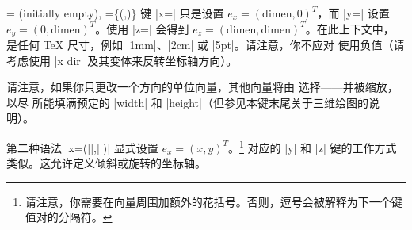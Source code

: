 \begin{pgfplotsxykeylist}{%
    \x= (initially empty),
    \x={\{(,)\}}%
}
    键 |x=| 只是设置 $e_x = (\text{dimen},0)^T$，而 |y=| 设置 $e_y = (0,\text{dimen})^T$。使用 |z=| 会得到 $e_z = (\text{dimen},\text{dimen})^T$。在此上下文中， 是任何 \TeX{} 尺寸，例如 |1mm|、|2cm| 或 |5pt|。请注意，你不应对  使用负值（请考虑使用 |x dir| 及其变体来反转坐标轴方向）。
\begin{codeexample}[]
\end{codeexample}

\begin{codeexample}[]
\end{codeexample}

    请注意，如果你只更改一个方向的单位向量，其他向量将由 \PGFPlots{} 选择——并被缩放，以尽 \PGFPlots{} 所能填满预定的 |width| 和 |height|（但参见本键末尾关于三维绘图的说明）。
\begin{codeexample}[]
\end{codeexample}

    第二种语法 |x={(||,||)}| 显式设置 $e_x = (\mathit{x},\mathit{y})^T$。\footnote{请注意，你需要在向量周围加额外的花括号。否则，逗号会被解释为下一个键值对的分隔符。} 对应的 |y| 和 |z| 键的工作方式类似。这允许定义倾斜或旋转的坐标轴。

\begin{codeexample}[]
\end{codeexample}


\end{pgfplotsxykeylist}
